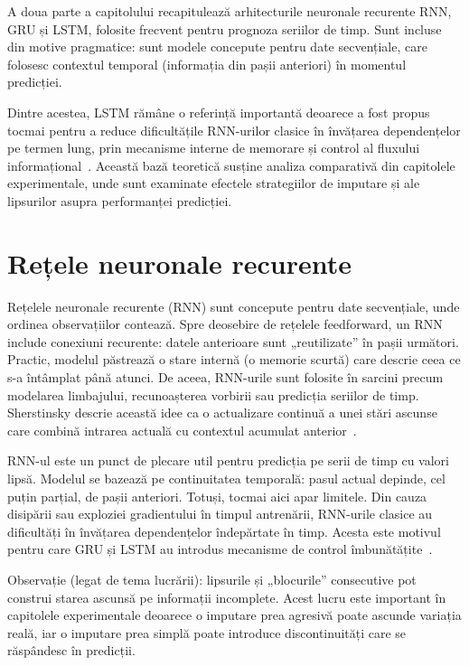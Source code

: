 A doua parte a capitolului recapitulează arhitecturile neuronale recurente RNN, GRU și LSTM, folosite frecvent pentru prognoza seriilor de timp. Sunt incluse din motive pragmatice: sunt modele concepute pentru date secvențiale, care folosesc contextul temporal (informația din pașii anteriori) în momentul predicției.

Dintre acestea, LSTM rămâne o referință importantă deoarece a fost propus tocmai pentru a reduce dificultățile RNN-urilor clasice în învățarea dependențelor pe termen lung, prin mecanisme interne de memorare și control al fluxului informațional~\cite{hochreiter1997lstm}. Această bază teoretică susține analiza comparativă din capitolele experimentale, unde sunt examinate efectele strategiilor de imputare și ale lipsurilor asupra performanței predicției.

\section{Rețele neuronale recurente}

Rețelele neuronale recurente (RNN) sunt concepute pentru date secvențiale, unde ordinea observațiilor contează. Spre deosebire de rețelele feedforward, un RNN include conexiuni recurente: datele anterioare sunt „reutilizate” în pașii următori. Practic, modelul păstrează o stare internă (o memorie scurtă) care descrie ceea ce s-a întâmplat până atunci. De aceea, RNN-urile sunt folosite în sarcini precum modelarea limbajului, recunoașterea vorbirii sau predicția seriilor de timp. Sherstinsky descrie această idee ca o actualizare continuă a unei stări ascunse care combină intrarea actuală cu contextul acumulat anterior~\cite{sherstinsky2020rnn}.

RNN-ul este un punct de plecare util pentru predicția pe serii de timp cu valori lipsă. Modelul se bazează pe continuitatea temporală: pasul actual depinde, cel puțin parțial, de pașii anteriori. Totuși, tocmai aici apar limitele. Din cauza disipării sau exploziei gradientului în timpul antrenării, RNN-urile clasice au dificultăți în învățarea dependențelor îndepărtate în timp. Acesta este motivul pentru care GRU și LSTM au introdus mecanisme de control îmbunătățite~\cite{sherstinsky2020rnn}.

Observație (legat de tema lucrării): lipsurile și „blocurile” consecutive pot construi starea ascunsă pe informații incomplete. Acest lucru este important în capitolele experimentale deoarece o imputare prea agresivă poate ascunde variația reală, iar o imputare prea simplă poate introduce discontinuități care se răspândesc în predicții.

